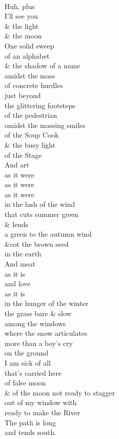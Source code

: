 \documentclass[smalldemyvopaper,11pt,twoside,onecolumn,openright,extrafontsizes]{memoir}
\begin{document}
\\Huh, plus
\\I'll see you
\\\& the light
\\\& the moon
\\One solid sweep
\\of an alphabet
\\\& the shadow of a name
\\amidst the mass
\\of concrete hurdles
\\just beyond
\\the glittering footsteps
\\of the pedestrian
\\omidst the massing smiles
\\of the Soup Cook
\\\& the busy light
\\of the Stage
\\And art
\\as it were
\\as it were
\\as it were
\\in the lash of the wind
\\that cuts summer green
\\\& lends
\\a green to the autumn wind
\\\&cot the brown seed
\\in the earth
\\And meat
\\as it is
\\and love
\\as it is
\\in the hunger of the winter
\\the grass bare \& slow
\\among the windows
\\where the snow articulates
\\more than a boy's cry
\\on the ground
\\I am sick of all
\\that's carried here
\\of false moon
\\\& of the moon not ready to stagger
\\out of my window with
\\ready to make the River
\\The path is long
\\and tends south.
\end{document}
